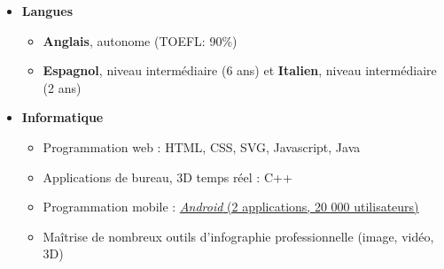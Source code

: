 \documentclass[a4paper,11pt]{article} %
\newcommand{\trad}[2]{#2}
\newenvironment{customitemize}[0]
  { \begin{itemize}
    \addtolength{\itemsep}{\trad{-0.2}{0}\baselineskip}
    \addtolength{\baselineskip}{\trad{-0.2}{0}\baselineskip} }
  { \end{itemize} }
\begin{document}
\begin{customitemize}
\item \textbf{\trad{Languages}{Langues}}
	\begin{itemize} 
	\trad{\item \textbf{French}, mother tongue}{}
	\item \trad{\textbf{English}, fluent (TOEFL: 90\%)} %
				{\textbf{Anglais}, autonome (TOEFL: 90\%)} %
	\item \trad{\textbf{Spanish}, intermediate (6 years) and \textbf{Italian}, intermediate (2 years)} %
				{\textbf{Espagnol}, niveau intermédiaire (6 ans) et \textbf{Italien}, niveau intermédiaire (2 ans)}
	\end{itemize}
\item \textbf{\trad{Computer}{Informatique}}
	\begin{itemize}
	\item \trad{Web: HTML, CSS, SVG, Javascript, Java}											{Programmation web : HTML, CSS, SVG, Javascript, Java}
	\item \trad{Desktop applications and real time 3D: C++}										{Applications de bureau, 3D temps réel : C++}
	\item \trad{Mobile: \href{https://market.android.com/developer?pub=Steren+Giannini}{\textit{Android} (2 applications, 20 000 users)}}									  					{Programmation mobile : \href{https://market.android.com/developer?pub=Steren+Giannini}{\textit{Android} (2 applications, 20 000 utilisateurs)}}
	\item \trad{Knowledge of many digital art applications}							            {Maîtrise de nombreux outils d'infographie professionnelle (image, vidéo, 3D)}
	\end{itemize}
\end{customitemize}
\end{document}
